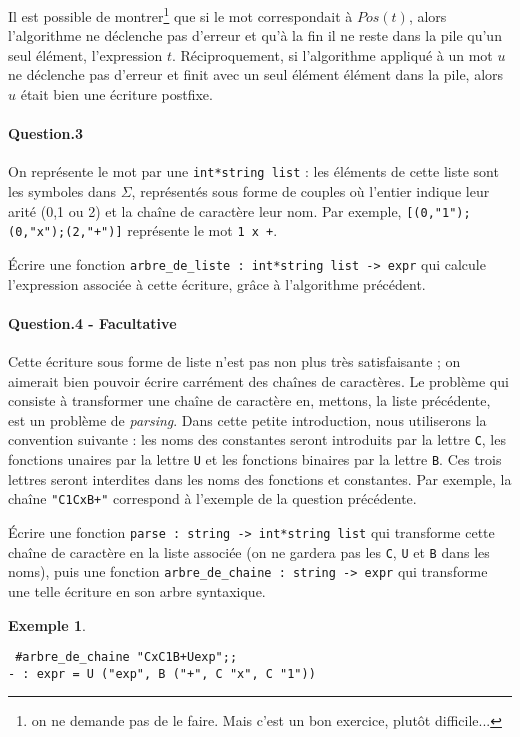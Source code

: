 \documentclass[10pt,a4paper]{article}
\theoremstyle{definition}
\newtheorem*{Ex}{Exemple}
\begin{document}
Il est possible de montrer\footnote{on ne demande pas de le faire. Mais c'est 
un bon exercice, plutôt difficile...} que si le mot 
correspondait à $Pos(t)$, alors l'algorithme ne déclenche pas d'erreur et qu'à la
fin il ne reste dans la pile qu'un seul élément, l'expression $t$. Réciproquement, si 
l'algorithme appliqué à un mot $u$ ne déclenche pas d'erreur et finit avec un 
seul élément élément dans la pile, alors $u$ était bien une écriture postfixe.

\paragraph{Question.3} On représente le mot par une \texttt{int*string list} :
les éléments de cette liste sont les symboles dans $\Sigma$, représentés sous
forme de couples où l'entier indique leur arité (0,1 ou 2) et la chaîne de caractère leur
nom. Par exemple, \texttt{[(0,"1");(0,"x");(2,"+")]} représente le mot \texttt{1 x +}.

Écrire une fonction \texttt{arbre\_de\_liste : int*string list -> expr} qui 
calcule l'expression associée à cette écriture, grâce à l'algorithme précédent.

\paragraph{Question.4 - Facultative} Cette écriture sous forme de liste n'est pas non plus
très satisfaisante ; on aimerait bien pouvoir écrire carrément des chaînes de 
caractères. Le problème qui consiste à transformer une chaîne de caractère
en, mettons, la liste précédente, est un problème de \textit{parsing}. Dans cette
petite introduction, nous utiliserons la convention suivante : les noms des
constantes seront introduits par la lettre \texttt{C}, les fonctions unaires
par la lettre \texttt{U} et les fonctions binaires par la lettre \texttt{B}. Ces
trois lettres seront interdites dans les noms des fonctions et constantes.
Par exemple, la chaîne \texttt{"C1CxB+"} correspond à l'exemple de la question
précédente.

Écrire une fonction \texttt{parse : string -> int*string list} qui transforme
cette chaîne de caractère en la liste associée (on ne gardera pas les \texttt{C},
\texttt{U} et \texttt{B} dans les noms), puis une fonction 
\texttt{arbre\_de\_chaine : string -> expr} qui transforme une telle écriture en
son arbre syntaxique.
\begin{Ex}
\begin{verbatim} #arbre_de_chaine "CxC1B+Uexp";;
- : expr = U ("exp", B ("+", C "x", C "1"))\end{verbatim}
\end{Ex}
\end{document}
